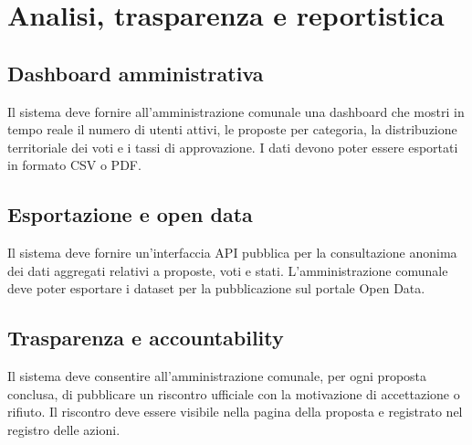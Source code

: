 \section{Analisi, trasparenza e reportistica}

\subsection{Dashboard amministrativa}
Il sistema deve fornire all’amministrazione comunale una dashboard che mostri in tempo reale il numero di utenti attivi, le proposte per categoria, la distribuzione territoriale dei voti e i tassi di approvazione.  
I dati devono poter essere esportati in formato CSV o PDF.

\subsection{Esportazione e open data}
Il sistema deve fornire un’interfaccia API pubblica per la consultazione anonima dei dati aggregati relativi a proposte, voti e stati.  
L’amministrazione comunale deve poter esportare i dataset per la pubblicazione sul portale Open Data.

\subsection{Trasparenza e accountability}
Il sistema deve consentire all’amministrazione comunale, per ogni proposta conclusa, di pubblicare un riscontro ufficiale con la motivazione di accettazione o rifiuto.  
Il riscontro deve essere visibile nella pagina della proposta e registrato nel registro delle azioni.
